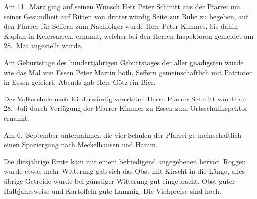 

\pstart
Am 11.\ März ging auf seinen Wunsch Herr Peter Schmitt aus\ob
der Pfarrei um seiner Gesundheit auf Bitten von dritter würdig\ob
Seite zur Ruhe zu begeben, auf den Pfarrer für Seffern zum\ob
Nachfolger wurde Herr Peter Kimmes, bis dahin Kaplan in\ob
Kefersarren\unsicher, ernannt, welcher bei den Herren Inspektoren\ob
gemeldet am 28.\ Mai angestellt wurde.

\pend
{}
\pstart

Am Geburtstage des hundertjährigen Geburtstages der aller\ohb
gnädigsten wurde wie das Mal von Essen Peter Martin\ob
both\unsicher, Seffern gemeinschaftlich mit Patrioten\unsicher{} in Essen\ob
gefeiert. Abends gab Herr Götz ein Bier\unsicher.

\pend
{}
\pstart

Der Volksschule\unsicher{} nach Kiederwürdig\unsicher{} versetzten Herrn Pfarrer\ob
Schmitt wurde am 28.\ Juli durch Verfügung der Pfarrer\ob
Kimmer\unsicher{} zu Essen zum Ortsschulinspektor ernannt.

\pend
{}
\pstart

Am 6.\ September unternahmen die vier Schulen der Pfarrei ge\ohb
meinschaftlich einen Spaziergang nach Meckelhausen und\ob
Hamm.

\pend
{}
\pstart

%
 Die diesjährige Ernte kam mit einem befriedigend angegebenen\unsicher\ob
hervor. Roggen wurde etwas\unsicher{} mehr Witterung gab sich\ob
das Obst mit Kirscht in die Länge, alles übrige Getreide\ob
wurde bei günstiger Witterung gut eingebracht. Obst guter\ob
{}%
Halbjahrsweise\unsicher{} und Kartoffeln gute Lammig\unsicher. Die Viehpreise\ob
sind hoch.
\pend
